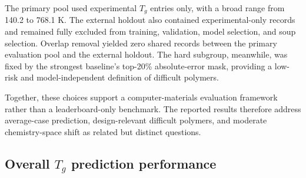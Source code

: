 \documentclass[review,12pt]{elsarticle}
\begin{document}
The primary pool used experimental $T_g$ entries only, with a broad range from 140.2 to 768.1 K. The external holdout also contained experimental-only records and remained fully excluded from training, validation, model selection, and soup selection. Overlap removal yielded zero shared records between the primary evaluation pool and the external holdout. The hard subgroup, meanwhile, was fixed by the strongest baseline's top-20\% absolute-error mask, providing a low-risk and model-independent definition of difficult polymers.

Together, these choices support a computer-materials evaluation framework rather than a leaderboard-only benchmark. The reported results therefore address average-case prediction, design-relevant difficult polymers, and moderate chemistry-space shift as related but distinct questions.

\subsection{Overall \texorpdfstring{$T_g$}{Tg} prediction performance}

\begin{table}[t]
  \centering
  \caption{Overall performance on the primary test set. Run counts differ because the strongest baseline and proposed model come from the authoritative 100-run package, the classical and graph-only comparators were completed as 10-run audits, and polyBERT was completed as a matched five-seed audit. Paired significance tests are reported in the main text for the 100-run baseline-versus-proposed comparison. polyBERT is included as a five-seed sequence-baseline audit and is not pooled with the 100-run statistical package.}
  \label{tab:overall_performance}
\end{table}
\end{document}
